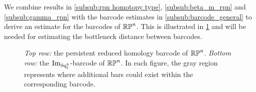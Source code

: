 We combine results in \cref{subsub:rpn homotopy type}, \cref{subsub:beta_m_rpn} and \cref{subsub:gamma_rpn} with the barcode estimates in \cref{subsub:barcode_general} to derive an estimate for the barcodes of $\mathbb{RP}^n$. 
This is illustrated in \cref{fig:sq barcodes} and will be needed for estimating the bottleneck distance between barcodes.

\begin{figure}
	\centering
	
	\caption{\emph{Top row:} the persistent reduced homology barcode of $\mathbb{RP}^n$.
		\emph{Bottom row:} the $\operatorname{Im}_{\operatorname{Sq}_\ell^k}$-barcode of $\mathbb{RP}^n$.
        In each figure, the gray region represents where additional bars could exist within the corresponding barcode.
	}
	\label{fig:sq barcodes}
\end{figure}
